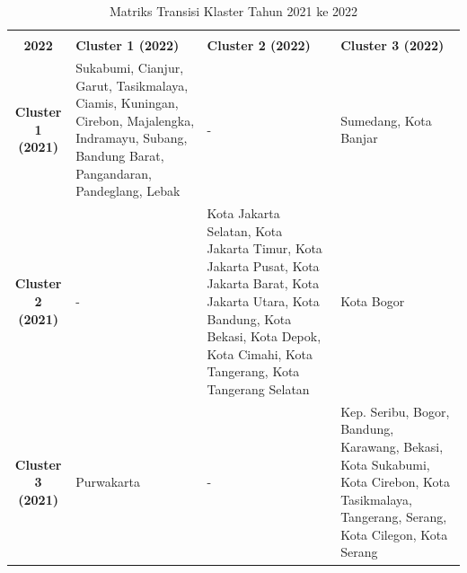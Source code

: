 \begin{table}[H]
\centering
\caption{Matriks Transisi Klaster Tahun 2021 ke 2022} \label{tab:transisi_2021_2022}
\begin{tabular}{|c|p{2cm}|p{2cm}|p{2cm}|}
\hline
\makecell{\textbf{Tahun 2021} \\ \textbf{2022}} & \textbf{Cluster 1 (2022)} & \textbf{Cluster 2 (2022)} & \textbf{Cluster 3 (2022)} \\ \hline
\textbf{Cluster 1 (2021)} & Sukabumi, Cianjur, Garut, Tasikmalaya, Ciamis, Kuningan, Cirebon, Majalengka, Indramayu, Subang, Bandung Barat, Pangandaran, Pandeglang, Lebak & - & Sumedang, Kota Banjar \\ \hline
\textbf{Cluster 2 (2021)} & - & Kota Jakarta Selatan, Kota Jakarta Timur, Kota Jakarta Pusat, Kota Jakarta Barat, Kota Jakarta Utara, Kota Bandung, Kota Bekasi, Kota Depok, Kota Cimahi, Kota Tangerang, Kota Tangerang Selatan & Kota Bogor \\ \hline
\textbf{Cluster 3 (2021)} & Purwakarta & - & Kep. Seribu, Bogor, Bandung, Karawang, Bekasi, Kota Sukabumi, Kota Cirebon, Kota Tasikmalaya, Tangerang, Serang, Kota Cilegon, Kota Serang \\ \hline
\end{tabular}
\end{table}